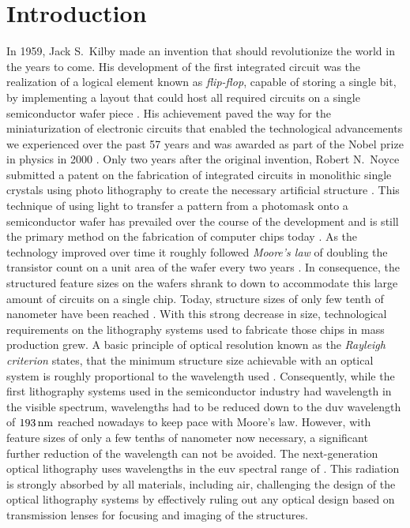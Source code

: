 \chapter{Introduction} \label{ch:Intro}
In 1959, Jack S.~Kilby made an invention that should revolutionize the world in the years to come. His development of the first integrated circuit was the realization of a logical element known as \emph{flip-flop}, capable of storing a single bit, by implementing a layout that could host all required circuits on a single semiconductor wafer piece  \cite{kilby_invention_1976}. His achievement paved the way for the miniaturization of electronic circuits that enabled the technological advancements we experienced over the past 57 years and was awarded as part of the Nobel prize in physics in 2000 \cite{noauthor_press_nodate}. Only two years after the original invention, Robert N.~Noyce submitted a patent on the fabrication of integrated circuits in monolithic single crystals using photo lithography to create the necessary artificial structure \cite{noyce_semiconductor_1961}. This technique of using light to transfer a pattern from a photomask onto a semiconductor wafer has prevailed over the course of the development and is still the primary method on the fabrication of computer chips today \cite{mack_fundamental_2008}. As the technology improved over time it roughly followed \emph{Moore's law} of doubling the transistor count on a unit area of the wafer every two years \cite{moore_cramming_1998}. In consequence, the structured feature sizes on the wafers shrank to down to accommodate this large amount of circuits on a single chip. Today, structure sizes of only few tenth of nanometer have been reached \cite{international_roadmap_committee_international_2015}. With this strong decrease in size, technological requirements on the lithography systems used to fabricate those chips in mass production grew. A basic principle of optical resolution known as the \emph{Rayleigh criterion} states, that the minimum structure size achievable with an optical system is roughly proportional to the wavelength used \cite{lord_rayleigh_xxxi._1879}. Consequently, while the first lithography systems used in the semiconductor industry had wavelength in the visible spectrum, wavelengths had to be reduced down to the \gls{duv} wavelength of $\nm{193}$ reached nowadays to keep pace with Moore's law. However, with feature sizes of only a few tenths of nanometer now necessary, a significant further reduction of the wavelength can not be avoided. The next-generation optical lithography uses wavelengths in the \gls{euv} spectral range of . This radiation is strongly absorbed by all materials, including air, challenging the design of the optical lithography systems by effectively ruling out any optical design based on transmission lenses for focusing and imaging of the structures.

